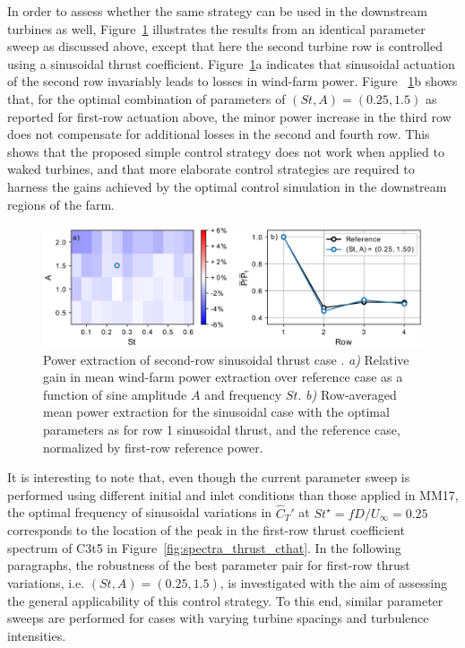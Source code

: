 \documentclass[wes, manuscript]{copernicus}
\newcommand{\cthat}{\widehat{C}_T'}
\begin{document}
In order to assess whether the same strategy can be used in the downstream turbines as well, Figure~\ref{fig:sinus_row2} illustrates the results from an identical parameter sweep as discussed above, except that here the second turbine row is controlled using a sinusoidal thrust coefficient. Figure~\ref{fig:sinus_row2}a indicates that sinusoidal actuation of the second row invariably leads to losses in wind-farm power. Figure ~\ref{fig:sinus_row2}b  shows that, for the optimal combination of parameters of  $(St, A) = (0.25, 1.5)$ as reported for first-row actuation above, the minor power increase in the third row does not compensate for additional losses in the second and fourth row. This shows that the proposed simple control strategy does not work when applied to waked turbines, and that more elaborate control strategies are required to harness the gains achieved by the optimal control simulation in the downstream regions of the farm. 
\begin{figure}
	\centering
	\includegraphics[width=\textwidth]{gains_row22.eps}
	\caption{Power extraction of second-row sinusoidal thrust case . \emph{a) } Relative gain in mean wind-farm power extraction over reference case as a function of sine amplitude $A$ and frequency $St$. \emph{b) } Row-averaged mean power extraction for the sinusoidal case with the optimal parameters as for row 1 sinusoidal thrust, and the reference case, normalized by first-row reference power.\label{fig:sinus_row2} }
\end{figure}

It is interesting to note that, even though the current parameter sweep is performed using different initial and inlet conditions than those applied in MM17, the optimal frequency of sinusoidal variations in $\cthat$ at $St^\star = f D / U_\infty = 0.25$ corresponds to the location of the peak in the first-row thrust coefficient spectrum of C3t5 in Figure~\ref{fig:spectra_thrust_cthat}. In the following paragraphs, the robustness of the best parameter pair for first-row thrust variations, i.e. $(St, A) = (0.25, 1.5)$, is investigated with the aim of assessing the general applicability of this control strategy. To this end, similar parameter sweeps are performed for cases with varying turbine spacings and turbulence intensities.
\end{document}
